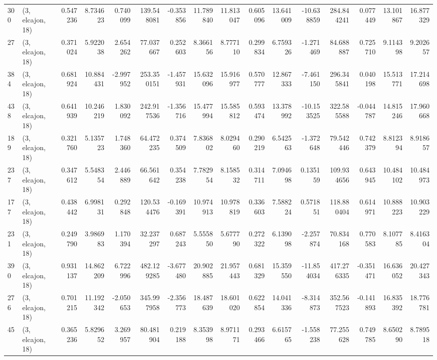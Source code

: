 \begin{tabular}{llrrrrrrrrrrrrrr}
300 &  (3, elcajon, 18) &   0.547236 &   8.734623 &   0.740099 &   139.548081 &  -0.353856 &  11.789840 &  11.813047 &  0.605096 &  13.641009 & -10.638859 &    284.844241 &    0.077449 &   13.101867 &   16.877329 \\
27  &  (3, elcajon, 18) &   0.371024 &   5.922038 &   2.654262 &    77.037667 &   0.252603 &   8.366156 &   8.777110 &  0.299834 &   6.759326 &  -1.271469 &     84.688887 &    0.725710 &    9.114398 &    9.202657 \\
384 &  (3, elcajon, 18) &   0.681924 &  10.884431 &  -2.997952 &   253.350151 &  -1.457931 &  15.632096 &  15.916977 &  0.570777 &  12.867333 &  -7.461150 &    296.345841 &    0.040198 &   15.513771 &   17.214698 \\
438 &  (3, elcajon, 18) &   0.641939 &  10.246219 &   1.830092 &   242.917536 &  -1.356716 &  15.477994 &  15.585812 &  0.593474 &  13.378992 & -10.153525 &    322.585588 &   -0.044787 &   14.815246 &   17.960668 \\
189 &  (3, elcajon, 18) &   0.321760 &   5.135723 &   1.748360 &    64.472235 &   0.374509 &   7.836802 &   8.029460 &  0.290219 &   6.542563 &  -1.372648 &     79.542446 &    0.742379 &    8.812394 &    8.918657 \\
237 &  (3, elcajon, 18) &   0.347612 &   5.548354 &   2.446889 &    66.561642 &   0.354238 &   7.782954 &   8.158532 &  0.314711 &   7.094698 &   0.135159 &    109.934656 &    0.643945 &   10.484102 &   10.484973 \\
177 &  (3, elcajon, 18) &   0.438442 &   6.998131 &   0.292848 &   120.534476 &  -0.169391 &  10.974913 &  10.978819 &  0.336603 &   7.588224 &   0.571851 &    118.880404 &    0.614971 &   10.888223 &   10.903229 \\
231 &  (3, elcajon, 18) &   0.249790 &   3.986983 &   1.170394 &    32.237297 &   0.687243 &   5.555850 &   5.677790 &  0.272322 &   6.139098 &  -2.257874 &     70.834168 &    0.770583 &    8.107785 &    8.416304 \\
390 &  (3, elcajon, 18) &   0.931137 &  14.862209 &   6.722996 &   482.129285 &  -3.677480 &  20.902885 &  21.957443 &  0.681329 &  15.359550 & -11.854034 &    417.276335 &   -0.351471 &   16.636052 &   20.427343 \\
276 &  (3, elcajon, 18) &   0.701215 &  11.192342 &  -2.050653 &   345.997958 &  -2.356773 &  18.487639 &  18.601020 &  0.622854 &  14.041336 &  -8.314873 &    352.567523 &   -0.141893 &   16.835392 &   18.776781 \\
45  &  (3, elcajon, 18) &   0.365236 &   5.829652 &   3.269957 &    80.481904 &   0.219188 &   8.353998 &   8.971171 &  0.293466 &   6.615765 &  -1.558238 &     77.255628 &    0.749785 &    8.650290 &    8.789518 \\

\end{tabular}
